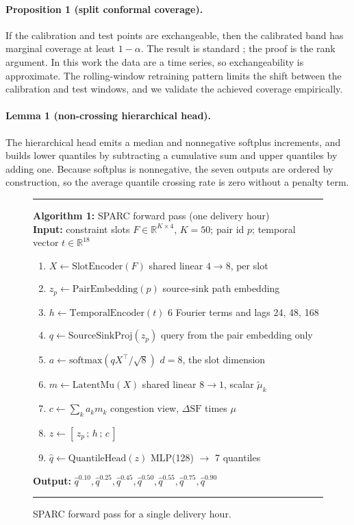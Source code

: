 \documentclass[twoside]{article}
\begin{document}
\paragraph{Proposition 1 (split conformal coverage).} If the calibration and test points are exchangeable, then the calibrated band has marginal coverage at least $1-\alpha$. The result is standard \citep{vovk2005algorithmic, lei2018distribution}; the proof is the rank argument. In this work the data are a time series, so exchangeability is approximate. The rolling-window retraining pattern limits the shift between the calibration and test windows, and we validate the achieved coverage empirically.

\paragraph{Lemma 1 (non-crossing hierarchical head).} The hierarchical head emits a median and nonnegative softplus increments, and builds lower quantiles by subtracting a cumulative sum and upper quantiles by adding one. Because softplus is nonnegative, the seven outputs are ordered by construction, so the average quantile crossing rate is zero without a penalty term.

\begin{figure}[t]
\centering
\begin{minipage}{\linewidth}
\hrule\vspace{2pt}
\textbf{Algorithm 1:} SPARC forward pass (one delivery hour)\\
\small
\textbf{Input:} constraint slots $F \in \mathbb{R}^{K \times 4}$, $K=50$; pair id $p$; temporal vector $t \in \mathbb{R}^{18}$\\
\begin{enumerate}\setlength\itemsep{0pt}
\item $X \gets \mathrm{SlotEncoder}(F)$ \hfill shared linear $4 \to 8$, per slot
\item $z_p \gets \mathrm{PairEmbedding}(p)$ \hfill source-sink path embedding
\item $h \gets \mathrm{TemporalEncoder}(t)$ \hfill 6 Fourier terms and lags 24, 48, 168
\item $q \gets \mathrm{SourceSinkProj}(z_p)$ \hfill query from the pair embedding only
\item $a \gets \mathrm{softmax}(q X^\top / \sqrt{8})$ \hfill $d=8$, the slot dimension
\item $m \gets \mathrm{LatentMu}(X)$ \hfill shared linear $8 \to 1$, scalar $\tilde{\mu}_k$
\item $c \gets \sum_k a_k m_k$ \hfill congestion view, $\Delta\mathrm{SF}$ times $\mu$
\item $z \gets [\,z_p\,;\,h\,;\,c\,]$
\item $\hat q \gets \mathrm{QuantileHead}(z)$ \hfill MLP(128) $\to$ 7 quantiles
\end{enumerate}
\textbf{Output:} $\hat q^{0.10}, \hat q^{0.25}, \hat q^{0.45}, \hat q^{0.50}, \hat q^{0.55}, \hat q^{0.75}, \hat q^{0.90}$
\vspace{2pt}\hrule
\end{minipage}
\caption{SPARC forward pass for a single delivery hour.}
\label{alg:forward}
\end{figure}
\end{document}
